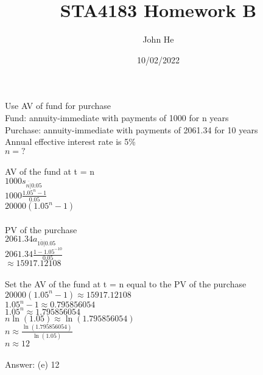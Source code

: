 \documentclass[12pt]{article}
\title{STA4183 Homework B}
\author{John He}
\date{10/02/2022}
\begin{document}
\maketitle

\section{}
Use AV of fund for purchase\\
Fund: annuity-immediate with payments of 1000 for n years\\
Purchase: annuity-immediate with payments of 2061.34 for 10 years\\
Annual effective interest rate is 5\%\\
$n=?$\\
\\
AV of the fund at t = n\\
$1000s_{\overline{n|}0.05}$\\
$1000\frac{1.05^{n}-1}{0.05}$\\
$20000(1.05^{n}-1)$\\
\\
PV of the purchase\\
$2061.34a_{\overline{10|}0.05}$\\
$2061.34\frac{1-1.05^{-10}}{0.05}$\\
$\approx15917.12108$\\
\\
Set the AV of the fund at t = n equal to the PV of the purchase\\
$20000(1.05^{n}-1)\approx15917.12108$\\
$1.05^{n}-1\approx0.795856054$\\
$1.05^{n}\approx1.795856054$\\
$n\ln(1.05)\approx\ln(1.795856054)$\\
$n\approx\frac{\ln(1.795856054)}{\ln(1.05)}$\\
$n\approx12$\\
\\
Answer: (e) 12
\end{document}
